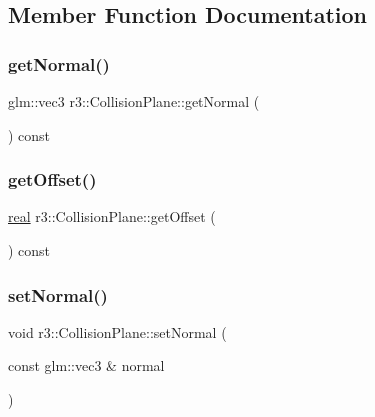 \subsection{Member Function Documentation}
\mbox{\label{classr3_1_1_collision_plane_aa6605acf447da4e45084e6d25c1067ad}} 
\subsubsection{\texorpdfstring{get\+Normal()}{getNormal()}}
{\footnotesize\ttfamily glm\+::vec3 r3\+::\+Collision\+Plane\+::get\+Normal (\begin{DoxyParamCaption}{ }\end{DoxyParamCaption}) const}

\mbox{\label{classr3_1_1_collision_plane_a62e2b4bd6a811f8d2541329cd9a49bf8}} 
\subsubsection{\texorpdfstring{get\+Offset()}{getOffset()}}
{\footnotesize\ttfamily \mbox{\hyperlink{namespacer3_ab2016b3e3f743fb735afce242f0dc1eb}{real}} r3\+::\+Collision\+Plane\+::get\+Offset (\begin{DoxyParamCaption}{ }\end{DoxyParamCaption}) const}

\mbox{\label{classr3_1_1_collision_plane_a1fa140b6648f14bef9720ac0d4eefc99}} 
\subsubsection{\texorpdfstring{set\+Normal()}{setNormal()}}
{\footnotesize\ttfamily void r3\+::\+Collision\+Plane\+::set\+Normal (\begin{DoxyParamCaption}\item[{const glm\+::vec3 \&}]{normal }\end{DoxyParamCaption})}

